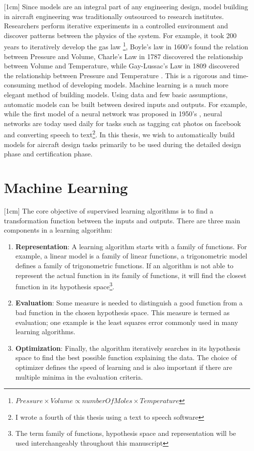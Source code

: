 [1cm]
Since models are an integral part of any engineering design, model building in aircraft engineering was traditionally outsourced to research institutes. Researchers perform iterative experiments in a controlled environment and discover patterns between the physics of the system. For example, it took 200 years to iteratively develop the gas law \footnote{$Pressure \times Volume \propto numberOfMoles \times Temperature$}, Boyle's law in 1600's found the relation between Pressure and Volume, Charle's Law in 1787 discovered the relationship between Volume and Temperature, while Gay-Lussac's Law in 1809 discovered the relationship between Pressure and Temperature \cite{clapeyron1834memoire}. This is a rigorous and time-consuming method of developing models. Machine learning is a much more elegant method of building models. Using data and few basic assumptions, automatic models can be built between desired inputs and outputs. For example, while the first model of a neural network was proposed in 1950's \cite{mcculloch1943logical, rosenblatt1958perceptron}, neural networks are today used daily for tasks such as tagging cat photos on facebook and converting speech to text\footnote{I wrote a fourth of this thesis using a text to speech software}. In this thesis, we wish to automatically build models for aircraft design tasks primarily to be used during the detailed design phase and certification phase. 


\section{Machine Learning}\label{secMachineLearning}
[1cm]
The core objective of supervised learning algorithms is to find a transformation function between the inputs and outputs. There are three main components in a learning algorithm:
\begin{enumerate}
\item \textbf{Representation}: A learning algorithm starts with a family of functions. For example, a linear model is a family of linear functions, a trigonometric model defines a family of trigonometric functions. If an algorithm is not able to represent the actual function in its family of functions, it will find the closest function in its hypothesis space\footnote{The term family of functions, hypothesis space and representation will be used interchangeably throughout this manuscript}.
\item \textbf{Evaluation}: Some measure is needed to distinguish a good function from a bad function in the chosen hypothesis space. This measure is termed as evaluation; one example is the least squares error commonly used in many learning algorithms. 
\item \textbf{Optimization}: Finally, the algorithm iteratively searches in its hypothesis space to find the best possible function explaining the data. The choice of optimizer defines the speed of learning and is also important if there are multiple minima in the evaluation criteria.
\end{enumerate}


